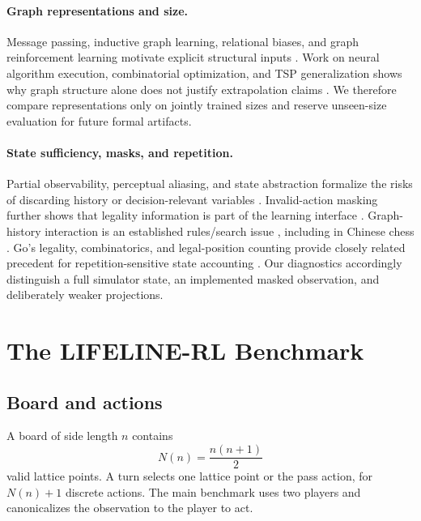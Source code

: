 \documentclass{article}
\begin{document}
\paragraph{Graph representations and size.}
Message passing, inductive graph learning, relational biases, and graph
reinforcement learning motivate explicit structural inputs
\citep{gilmer2017neural,hamilton2017inductive,battaglia2018relational,
jiang2018graph}. Work on neural algorithm execution, combinatorial
optimization, and TSP generalization shows why graph structure alone does not
justify extrapolation claims \citep{xu2019what,joshi2020learning}. We therefore compare representations only
on jointly trained sizes and reserve unseen-size evaluation for future formal
artifacts.

\paragraph{State sufficiency, masks, and repetition.}
Partial observability, perceptual aliasing, and state abstraction formalize the
risks of discarding history or decision-relevant variables
\citep{kaelbling1998planning,chrisman1992perceptual,
givan2003equivalence,abel2017near}. Invalid-action masking further shows that
legality information is part of the learning interface
\citep{huang2022invalid}. Graph-history interaction is an established
rules/search issue \citep{campbell1985graphhistory,kishimoto2004graph},
including in Chinese chess \citep{wu2006graphhistory}. Go's legality,
combinatorics, and legal-position counting provide closely related precedent
for repetition-sensitive state accounting
\citep{tromp2007combinatorics,tromp2016number}. Our
diagnostics accordingly distinguish a full simulator
state, an implemented masked observation, and deliberately weaker projections.

\section{The LIFELINE-RL Benchmark}
\label{sec:environment}

\subsection{Board and actions}

A board of side length $n$ contains
\begin{equation}
  N(n) = \frac{n(n+1)}{2}
\end{equation}
valid lattice points. A turn selects one lattice point or the pass action, for
$N(n)+1$ discrete actions. The main benchmark uses two players and canonicalizes
the observation to the player to act.
\end{document}
